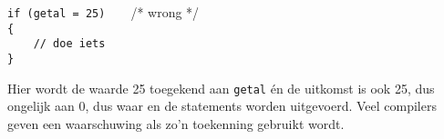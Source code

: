 \hspace*{1em}\texttt{if (getal = 25)}\ \ \ \ /* wrong */\\
\hspace*{1em}\texttt{\{}\\
\hspace*{1em}\texttt{\ \ \ \ // doe iets}\\
\hspace*{1em}\texttt{\}}

Hier wordt de waarde 25 toegekend aan \texttt{getal} én de uitkomst is ook 25, dus ongelijk aan 0, dus waar en de statements worden uitgevoerd. Veel compilers geven een waarschuwing als zo'n toekenning gebruikt wordt.

